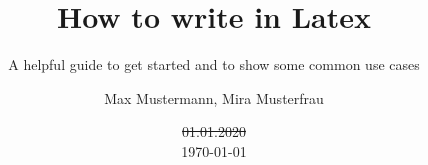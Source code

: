 \documentclass[
        faculty=f1,
        paper=a4,
        fontsize=11pt,
        fontfamily=sans-serif,
        language=english,
        parskip=never+,
        linespacing=single,
        twoside=true,
        todos=off,
        draft=false,
    ]{HsH-report}
\author{
    Max Mustermann,
    Mira Musterfrau
} %
\title{How to write in Latex}
\subtitle{A helpful guide to get started and to show some common use cases}
\date{\st{01.01.2020}\\\today}
\begin{document}
    \frontmatter

    \maketitle[c]

    \declarationofauthorship

    \begin{abstract}
        \lipsum[5-6]
    \end{abstract}

    \tableofcontents

    \mainmatter

    

    \listoffigures
    \listoftables
\end{document}
